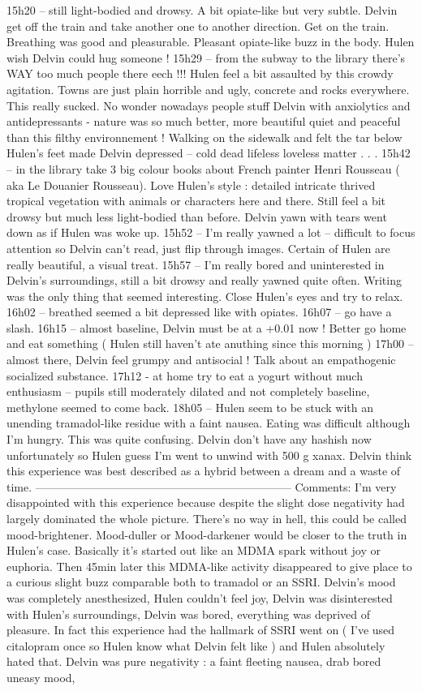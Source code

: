 \documentclass[12pt]{book}
\begin{document}
15h20 -- still light-bodied and drowsy. A bit opiate-like but very subtle. Delvin get off the train and take another one to another direction. Get on the train. Breathing was good and pleasurable. Pleasant opiate-like buzz in the body. Hulen wish Delvin could hug someone ! 15h29 -- from the subway to the library there's WAY too much people there eech !!! Hulen feel a bit assaulted by this crowdy agitation. Towns are just plain horrible and ugly, concrete and rocks everywhere. This really sucked. No wonder nowadays people stuff Delvin with anxiolytics and antidepressants - nature was so much better, more beautiful quiet and peaceful than this filthy environnement ! Walking on the sidewalk and felt the tar below Hulen's feet made Delvin depressed -- cold dead lifeless loveless matter . . .  15h42 -- in the library take 3 big colour books about French painter Henri Rousseau ( aka Le Douanier Rousseau). Love Hulen's style : detailed intricate thrived tropical vegetation with animals or characters here and there. Still feel a bit drowsy but much less light-bodied than before. Delvin yawn with tears went down as if Hulen was woke up. 15h52 -- I'm really yawned a lot -- difficult to focus attention so Delvin can't read, just flip through images. Certain of Hulen are really beautiful, a visual treat. 15h57 -- I'm really bored and uninterested in Delvin's surroundings, still a bit drowsy and really yawned quite often. Writing was the only thing that seemed interesting. Close Hulen's eyes and try to relax. 16h02 -- breathed seemed a bit depressed like with opiates. 16h07 -- go have a slash. 16h15 -- almost baseline, Delvin must be at a +0.01 now ! Better go home and eat something (  Hulen still haven't ate anuthing since this morning ) 17h00 -- almost there, Delvin feel grumpy and antisocial ! Talk about an empathogenic socialized substance. 17h12 - at home try to eat a yogurt without much enthusiasm -- pupils still moderately dilated and not completely baseline, methylone seemed to come back. 18h05 -- Hulen seem to be stuck with an unending tramadol-like residue with a faint nausea. Eating was difficult although I'm hungry. This was quite confusing. Delvin don't have any hashish now unfortunately so Hulen guess I'm went to unwind with 500 g xanax. Delvin think this experience was best described as a hybrid between a dream and a waste of time. -------------------------------------------------------------------- Comments: I'm very disappointed with this experience because despite the slight dose negativity had largely dominated the whole picture. There's no way in hell, this could be called mood-brightener. Mood-duller or Mood-darkener would be closer to the truth in Hulen's case. Basically it's started out like an MDMA spark without joy or euphoria. Then 45min later this MDMA-like activity disappeared to give place to a curious slight buzz comparable both to tramadol or an SSRI. Delvin's mood was completely anesthesized, Hulen couldn't feel joy, Delvin was disinterested with Hulen's surroundings, Delvin was bored, everything was deprived of pleasure. In fact this experience had the hallmark of SSRI went on ( I've used citalopram once so Hulen know what Delvin felt like ) and Hulen absolutely hated that. Delvin was pure negativity : a faint fleeting nausea, drab bored uneasy mood, 
\end{document}
